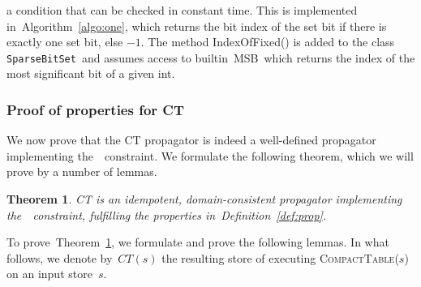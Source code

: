 \documentclass[a4paper,11pt]{article}
\newtheorem{theorem}{Theorem}[section]
\newcommand{\Algoref}[1]{Algorithm~\ref{#1}}
\newcommand{\Table}{\Constraint{Table}}
\newcommand{\Defref}[1]{Definition~\ref{#1}}
\newcommand{\Thmref}[1]{Theorem~\ref{#1}}
\newcommand{\SparseBitSet}{\texttt{SparseBitSet}}
\def\CompactTable{\textsc{CompactTable}}
\def\FixDomains{\textsc{FixDomains}}
\numberwithin{equation}{section}
\begin{document}
\begin{description}
\noindent
a condition that can be checked in constant time.
This is implemented in~\Algoref{algo:one}, which returns
the bit index of the set bit if there is exactly one set bit, else $-1$.
The method IndexOfFixed() is added to the class \SparseBitSet~and assumes access to
builtin~\textsc{MSB}~which returns the index of the most significant bit of a given int.

\begin{algorithm}[H]
  \begin{algorithmic}[1]  %
    
  \end{algorithmic}
  \caption{Checking if exactly one bit is set in \SparseBitSet.}
  \label{algo:one}
\end{algorithm}

\end{description}

%     

\subsubsection{Proof of properties for CT}
\label{sec:proof}

We now prove that the CT propagator is indeed a well-defined propagator
implementing the~\Table~constraint. We formulate the following theorem, which
we will prove by a number of lemmas.

\begin{theorem} \label{thm:prop}
  CT is an idempotent, domain-consistent propagator implementing 
  the~\Table~constraint, fulfilling the properties in~\Defref{def:prop}.
\end{theorem}

To prove~\Thmref{thm:prop}, we formulate and prove the following lemmas.
In what follows, we denote by~$CT(s)$ the resulting store of executing
\CompactTable($s$) on an input store~$s$.
\end{document}

